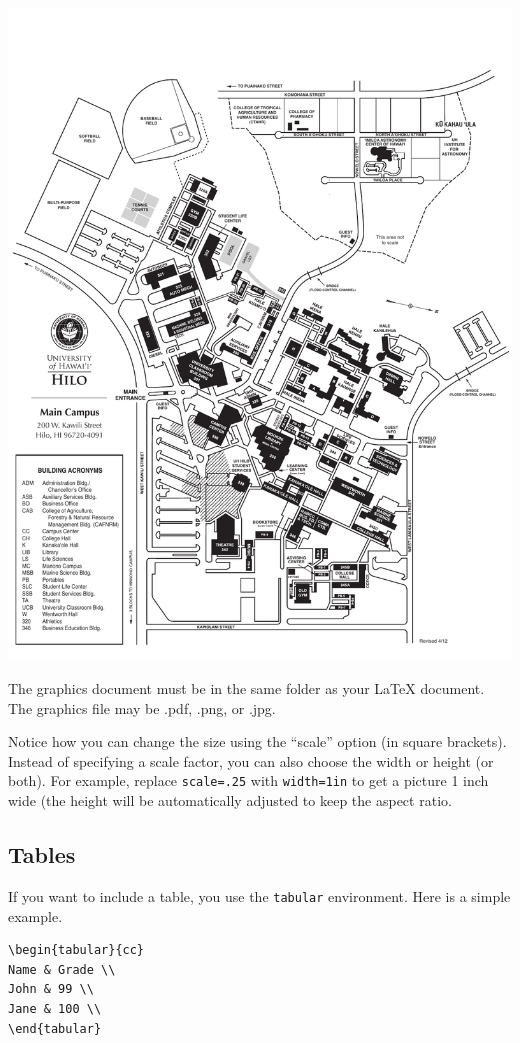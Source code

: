 \documentclass[12pt]{article}
\begin{document}
\includegraphics[scale=.25]{main_campus_map.pdf}

The graphics document must be in the same folder as your \LaTeX{} document. The graphics file may be .pdf, .png, or .jpg.

Notice how you can change the size using the ``scale'' option (in square brackets). Instead of specifying a scale factor, you can also choose the width or height (or both). For example, replace \verb|scale=.25| with \verb|width=1in| to get a picture 1 inch wide (the height will be automatically adjusted to keep the aspect ratio.

\subsection{Tables}

If you want to include a table, you use the \verb|tabular| environment. Here is a simple example.

\begin{verbatim}
\begin{tabular}{cc}
Name & Grade \\
John & 99 \\
Jane & 100 \\
\end{tabular}
\end{verbatim}
\end{document}
